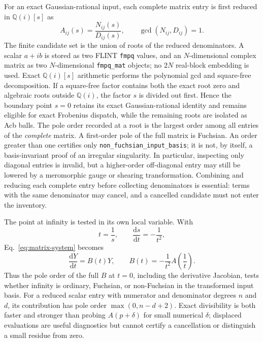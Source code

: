 \documentclass[11pt]{article}
\newcommand{\dd}{\mathrm d}
\begin{document}
For an exact Gaussian-rational input, each complete matrix entry is first reduced in
$\mathbb Q(i)[s]$ as
\begin{equation}
 A_{ij}(s)=\frac{N_{ij}(s)}{D_{ij}(s)},
 \qquad \gcd(N_{ij},D_{ij})=1.
\end{equation}
The finite candidate set is the union of roots of the reduced denominators.  A scalar
$a+ib$ is stored as two FLINT \texttt{fmpq} values, and an $N$-dimensional complex matrix as
two $N$-dimensional \texttt{fmpq\_mat} objects; no $2N$ real-block embedding is used.  Exact
$\mathbb Q(i)[s]$ arithmetic performs the polynomial gcd and square-free decomposition.  If a
square-free factor contains both the exact root zero and algebraic roots outside
$\mathbb Q(i)$, the factor $s$ is divided out first.  Hence the boundary point $s=0$ retains
its exact Gaussian-rational identity and remains eligible for exact Frobenius dispatch, while
the remaining roots are isolated as Acb balls.  The pole order recorded at a root is
the largest order among all entries of the \emph{complete} matrix.  A first-order pole of the
full matrix is Fuchsian.  An order greater than one certifies only
\texttt{non\_fuchsian\_input\_basis}; it is not, by itself, a basis-invariant proof of an
irregular singularity.  In particular, inspecting only diagonal entries is invalid, but a
higher-order off-diagonal entry may still be lowered by a meromorphic gauge or shearing
transformation.  Combining and reducing each complete entry before collecting denominators
is essential: terms with the same denominator may cancel, and a cancelled candidate must
not enter the inventory.

The point at infinity is tested in its own local variable.  With
\begin{equation}
 t=\frac{1}{s},\qquad \frac{\dd s}{\dd t}=-\frac{1}{t^2},
\end{equation}
Eq.~\eqref{eq:matrix-system} becomes
\begin{equation}
 \frac{\dd Y}{\dd t}=B(t)Y,
 \qquad B(t)=-\frac{1}{t^2}A\!\left(\frac{1}{t}\right).
 \label{eq:infinity-transform}
\end{equation}
Thus the pole order of the full $B$ at $t=0$, including the derivative Jacobian, tests
whether infinity is ordinary, Fuchsian, or non-Fuchsian in the transformed input basis.
For a reduced scalar entry with numerator and denominator degrees $n$ and $d$, its
contribution has pole order $\max(0,n-d+2)$.  Exact divisibility is both faster and stronger
than probing $A(p+\delta)$ for small numerical $\delta$; displaced evaluations are useful
diagnostics but cannot certify a cancellation or distinguish a small residue from zero.
\end{document}
